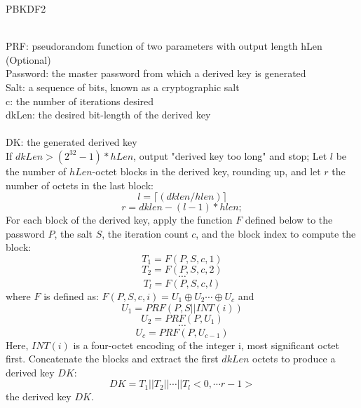 \begin{algorithm}[tbp]\footnotesize
\caption{PBKDF2}
\label{PBKDF2}
  	\begin{algorithmic}[1]
	    \REQUIRE ~~\\ 
	    PRF: pseudorandom function of two parameters with output length hLen (Optional)\\
	    Password: the master password from which a derived key is generated\\
	    Salt: a sequence of bits, known as a cryptographic salt\\
	    c: the number of iterations desired\\
	    dkLen: the desired bit-length of the derived key\\
	    \ENSURE ~~\\
	    DK: the generated derived key\\
	    \STATE If $dkLen > (2^{32} - 1) * hLen$, output "derived key too long" and stop;
	    \STATE Let $l$ be the number of $hLen$-octet blocks in the derived key,
	     rounding up, and let $r$ the number of octets in the last block:  
			$$l =\lceil (dklen/hlen) \rceil $$ 
			$$r =dklen -(l-1)*hlen;$$		
		\STATE For each block of the derived key, apply the function $F$ defined 
		below to the password $P$, the salt $S$, 
	  	the iteration count $c$, and the block index to compute the block:
			$$T_1=F(P,S,c,1)$$
			$$T_2=F(P,S,c,2)$$
			$$\cdots$$
			$$T_l=F(P,S,c,l)$$ 
		where $F$ is defined as: $F(P,S,c,i)=U_1 \oplus U_2  \cdots \oplus U_c$ and
			$$U_1=PRF(P,S||INT(i))$$ 
			$$U_2=PRF(P,U_1)$$
			$$\cdots$$
			$$U_c=PRF(P,U_{c-1})$$
		Here, $INT (i)$ is a four-octet encoding of the integer i, most significant octet first.
		\STATE Concatenate the blocks and extract the first $dkLen$ octets to 
		produce a derived key $DK$:  
			$$DK=T_1||T_2||\cdots|| T_l<0,\cdots r-1>$$
		\RETURN the derived key $DK$.		
    \end{algorithmic}
\end{algorithm}
 

